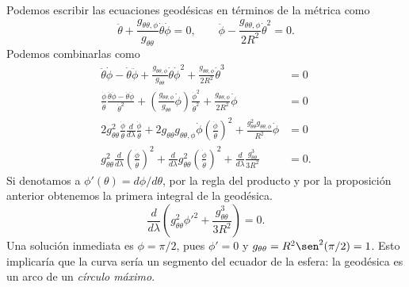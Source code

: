 Podemos escribir las ecuaciones geodésicas en términos de la métrica como
\begin{equation}
	\ddot \theta + \frac{g_{\theta\theta,\phi}}{g_{\theta\theta}}\dot\theta\dot\phi = 0, \qquad \ddot \phi - \frac{g_{\theta\theta,\phi}}{2R^2}\dot \theta^2 = 0.
\end{equation}
Podemos combinarlas como
\begin{equation}
	\begin{split}
		\ddot \theta \dot \phi - \dot\theta\ddot \phi + \frac{g_{\theta\theta,\phi}}{g_{\theta\theta}}\dot\theta\dot\phi^2 + \frac{g_{\theta\theta,\phi}}{2R^2}\dot \theta^3 &= 0\\
		\frac{\dot \phi}{\dot \theta}\frac{\ddot \theta \dot \phi - \dot\theta\ddot \phi}{\dot \theta^2} + \left(\frac{g_{\theta\theta,\phi}}{g_{\theta\theta}}\dot\phi \right)\frac{\dot \phi^2}{\dot \theta^2} + \frac{g_{\theta\theta,\phi}}{2R^2}\dot \phi &= 0\\
		2g^2_{\theta\theta}\frac{\dot \phi}{\dot \theta} \frac{d}{d\lambda}\frac{\dot \phi}{\dot \theta} + 2g_{\theta\theta} g_{\theta\theta,\phi}\dot \phi \left(\frac{\dot \phi}{\dot \theta}\right)^2 + \frac{g^2_{\theta\theta}g_{\theta\theta,\phi}}{R^2}\dot \phi &= 0\\
		g^2_{\theta\theta} \frac{d}{d\lambda}\left(\frac{\dot \phi}{\dot \theta}\right)^2
		+ \frac{d}{d\lambda}g^2_{\theta\theta}\left(\frac{\dot \phi}{\dot \theta}\right)^2
		+ \frac{d}{d\lambda}\frac{g^3_{\theta\theta}}{3R^2} &= 0.
	\end{split}
\end{equation}
Si denotamos a $\phi'(\theta) = d\phi/d\theta$, por la regla del producto y por la proposición anterior obtenemos la primera integral de la geodésica.
\begin{equation}
	\frac{d}{d\lambda}\left(g^2_{\theta\theta}\phi'^2 + \frac{g^3_{\theta\theta}}{3R^2} \right) = 0.
\end{equation}
Una solución inmediata es $\phi = \pi/2$, pues $\phi' = 0$ y $g_{\theta\theta} = R^2\sen^2(\pi/2) = 1$. Esto implicaría que la curva sería un segmento del ecuador de la esfera: la geodésica es un arco de un \emph{círculo máximo}.